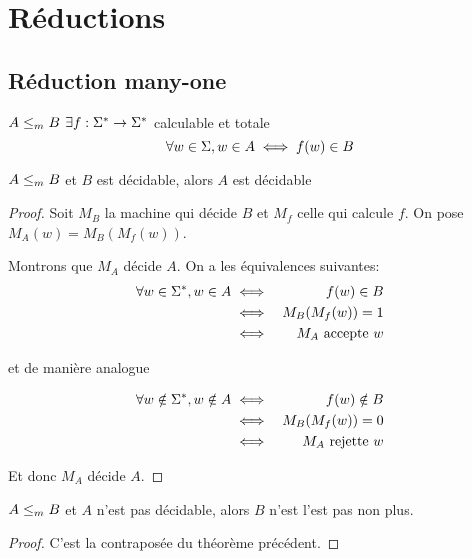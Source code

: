 \section{Réductions}

\subsection{Réduction many-one}

\begin{definition}
	$A \leq_m B$ \ssi $\exists f : \Sigma^{*} \to \Sigma^{*}$ calculable et totale \tlq
	$$\forall w \in \Sigma, w \in A \iff f(w) \in B$$
\end{definition}


\begin{theorem} \label{thm:leqm_dec}
	$A \leq_m B$ et $B$ est décidable, alors $A$ est décidable
\end{theorem}

\begin{proof}

	Soit $M_B$ la machine qui décide $B$ et $M_f$ celle qui calcule $f$. On pose $M_A (w) = M_B(M_f(w))$.

	Montrons que $M_A$ décide $A$. On a les équivalences suivantes:
	\begin{eqnarray*}
		\forall w \in \Sigma^{*}, w \in A &\iff& f(w) \in B \\
		&\iff& M_B (M_f (w)) = 1 \\
		&\iff& M_A \text{ accepte } w
	\end{eqnarray*}

	et de manière analogue

	\begin{eqnarray*}
		\forall w \notin \Sigma^{*}, w \notin A &\iff& f(w) \notin B \\
		&\iff& M_B (M_f (w)) = 0 \\
		&\iff& M_A \text{ rejette } w
	\end{eqnarray*}

	Et donc $M_A$ décide $A$.

\end{proof}


\begin{coro}
	$A \leq_m B$ et $A$ n'est pas décidable, alors $B$ n'est l'est pas non plus.
\end{coro}

\begin{proof}
	C'est la contraposée du théorème précédent.
\end{proof}

